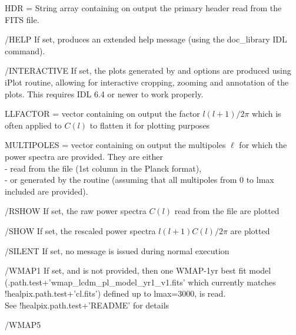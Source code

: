 \begin{keywords}
  \begin{kwlist}{} %
    \item[HDR =] %
	String array containing on output the primary header
      read from the FITS file. 
    \item[/HELP] %
	If set, produces an extended help message (using the doc\_library
    IDL command). 
    \item[/INTERACTIVE] %
	If set, the plots generated by  and  options are produced using iPlot routine, allowing 
           for interactive cropping, zooming and annotation of the plots. This
           requires IDL 6.4 or newer to work properly.
    \item[LLFACTOR =] %
	vector containing on output the factor $l(l+1)/2\pi$ which is often
          applied to $C(l)$ to flatten it for plotting purposes
    \item[MULTIPOLES =] %
	vector containing on output the multipoles
    $\ell$ for which the power spectra are provided. They are either\\
           - read from the file (1st column in the Planck format),\\
          - or generated by the routine (assuming that all
               multipoles from 0 to lmax included are provided).
    \item[/RSHOW] %
	If set, the raw power spectra $C(l)$ read from the file are plotted
    \item[/SHOW] %
	If set, the rescaled power spectra $l(l+1)C(l)/2\pi$ are plotted
    \item[/SILENT] %
	If set, no message is issued during normal execution
%
    \item[/WMAP1] %
           If set, and  
           is not provided, then one WMAP-1yr best fit
          model
(.path.test+\-'wmap\_lcdm\_pl\_model\_yr1\_v1.fits'
which currently matches !healpix.path.test+'cl.fits') 
          defined up to lmax=3000, is read.\\
          See !healpix.path.test+'README' for details
%
    \item[/WMAP5] %

\end{kwlist}
\end{keywords}
